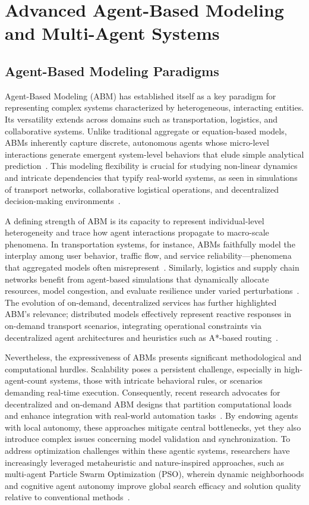 \documentclass[sigconf]{acmart}
\begin{document}
\section{Advanced Agent-Based Modeling and Multi-Agent Systems}

\subsection{Agent-Based Modeling Paradigms}

Agent-Based Modeling (ABM) has established itself as a key paradigm for representing complex systems characterized by heterogeneous, interacting entities. Its versatility extends across domains such as transportation, logistics, and collaborative systems. Unlike traditional aggregate or equation-based models, ABMs inherently capture discrete, autonomous agents whose micro-level interactions generate emergent system-level behaviors that elude simple analytical prediction~\cite{ref114}\cite{ref115}. This modeling flexibility is crucial for studying non-linear dynamics and intricate dependencies that typify real-world systems, as seen in simulations of transport networks, collaborative logistical operations, and decentralized decision-making environments~\cite{ref114}\cite{ref115}.

A defining strength of ABM is its capacity to represent individual-level heterogeneity and trace how agent interactions propagate to macro-scale phenomena. In transportation systems, for instance, ABMs faithfully model the interplay among user behavior, traffic flow, and service reliability---phenomena that aggregated models often misrepresent~\cite{ref114}. Similarly, logistics and supply chain networks benefit from agent-based simulations that dynamically allocate resources, model congestion, and evaluate resilience under varied perturbations~\cite{ref115}. The evolution of on-demand, decentralized services has further highlighted ABM’s relevance; distributed models effectively represent reactive responses in on-demand transport scenarios, integrating operational constraints via decentralized agent architectures and heuristics such as A*-based routing~\cite{ref114}\cite{ref115}.

Nevertheless, the expressiveness of ABMs presents significant methodological and computational hurdles. Scalability poses a persistent challenge, especially in high-agent-count systems, those with intricate behavioral rules, or scenarios demanding real-time execution. Consequently, recent research advocates for decentralized and on-demand ABM designs that partition computational loads and enhance integration with real-world automation tasks~\cite{ref114}\cite{ref115}. By endowing agents with local autonomy, these approaches mitigate central bottlenecks, yet they also introduce complex issues concerning model validation and synchronization. To address optimization challenges within these agentic systems, researchers have increasingly leveraged metaheuristic and nature-inspired approaches, such as multi-agent Particle Swarm Optimization (PSO), wherein dynamic neighborhoods and cognitive agent autonomy improve global search efficacy and solution quality relative to conventional methods~\cite{ref101}.
\end{document}
